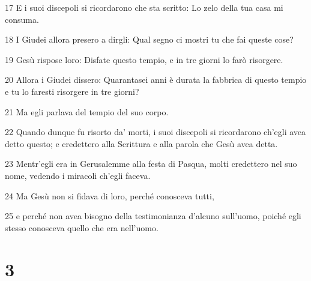 \par 17 E i suoi discepoli si ricordarono che sta scritto: Lo zelo della tua casa mi consuma.
\par 18 I Giudei allora presero a dirgli: Qual segno ci mostri tu che fai queste cose?
\par 19 Gesù rispose loro: Disfate questo tempio, e in tre giorni lo farò risorgere.
\par 20 Allora i Giudei dissero: Quarantasei anni è durata la fabbrica di questo tempio e tu lo faresti risorgere in tre giorni?
\par 21 Ma egli parlava del tempio del suo corpo.
\par 22 Quando dunque fu risorto da' morti, i suoi discepoli si ricordarono ch'egli avea detto questo; e credettero alla Scrittura e alla parola che Gesù avea detta.
\par 23 Mentr'egli era in Gerusalemme alla festa di Pasqua, molti credettero nel suo nome, vedendo i miracoli ch'egli faceva.
\par 24 Ma Gesù non si fidava di loro, perché conosceva tutti,
\par 25 e perché non avea bisogno della testimonianza d'alcuno sull'uomo, poiché egli stesso conosceva quello che era nell'uomo.

\chapter{3}

